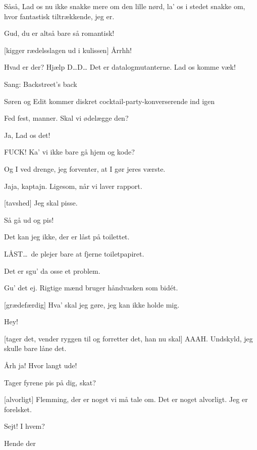 \documentclass[danish]{article}
\begin{document}
\begin{sketch}
 Såså, Lad os nu ikke snakke mere om den lille nørd, la' os i stedet
snakke om, hvor fantastisk tiltrækkende, jeg er.

 Gud, du er altså bare så romantisk!

[kigger rædelsslagen ud i kulissen] Årrhh!

 Hvad er der?  Hjælp
D\ldots{}D\ldots{} Det er datalogmutanterne. Lad os komme væk! 

\scene Sang: Backstreet's back

Søren og Edit kommer diskret cocktail-party-konverserende ind igen

 Fed fest, manner. Skal vi ødelægge den?

 Ja, Lad os det!

 FUCK! Ka' vi ikke bare gå hjem og kode?

 Og I ved drenge, jeg forventer, at I gør jeres værste.

 Jaja, kaptajn. Ligesom, når vi laver rapport.

[tavshed] Jeg skal pisse.

 Så gå ud og pis!

 Det kan jeg ikke, der er låst på toilettet.

 LÅST\ldots\ de plejer bare at fjerne toiletpapiret.

 Det er sgu' da osse et problem.

 Gu' det ej. Rigtige mænd bruger håndvasken som bid\'et.

[grædefærdig] Hva' skal jeg gøre, jeg kan ikke holde mig. 

 Hey!

[tager det, vender ryggen til og forretter det, han nu skal] AAAH.
Undskyld, jeg skulle bare låne det. 

 Årh ja! Hvor langt ude! 

 Tager fyrene pis på dig, skat?

[alvorligt] Flemming, der er noget vi må tale om. Det er noget alvorligt. Jeg er forelsket.

 Sejt! I hvem?

 Hende der 


\end{sketch}
\end{document}
